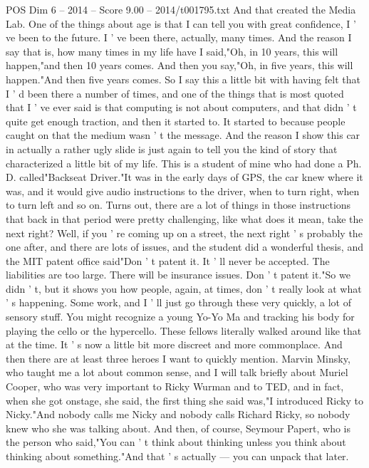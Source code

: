 \begin{textsample}{POS Dim 6 – 2014 – Score 9.00 – 2014/t001795.txt}
And that created the Media Lab.
One of the things about age is that I can tell you with great confidence, I ' ve been to the future.
I ' ve been there, actually, many times.
And the reason I say that is, how many times in my life have I said,"Oh, in 10 years, this will happen,"and then 10 years comes.
And then you say,"Oh, in five years, this will happen."And then five years comes.
So I say this a little bit with having felt that I ' d been there a number of times, and one of the things that is most quoted that I ' ve ever said is that computing is not about computers, and that didn ' t quite get enough traction, and then it started to.
It started to because people caught on that the medium wasn ' t the message.
And the reason I show this car in actually a rather ugly slide is just again to tell you the kind of story that characterized a little bit of my life.
This is a student of mine who had done a Ph.
D. called"Backseat Driver."It was in the early days of GPS, the car knew where it was, and it would give audio instructions to the driver, when to turn right, when to turn left and so on.
Turns out, there are a lot of things in those instructions that back in that period were pretty challenging, like what does it mean, take the next right?
Well, if you ' re coming up on a street, the next right ' s probably the one after, and there are lots of issues, and the student did a wonderful thesis, and the MIT patent office said"Don ' t patent it.
It ' ll never be accepted.
The liabilities are too large.
There will be insurance issues.
Don ' t patent it."So we didn ' t, but it shows you how people, again, at times, don ' t really look at what ' s happening.
Some work, and I ' ll just go through these very quickly, a lot of sensory stuff.
You might recognize a young Yo-Yo Ma and tracking his body for playing the cello or the hypercello.
These fellows literally walked around like that at the time.
It ' s now a little bit more discreet and more commonplace.
And then there are at least three heroes I want to quickly mention.
Marvin Minsky, who taught me a lot about common sense, and I will talk briefly about Muriel Cooper, who was very important to Ricky Wurman and to TED, and in fact, when she got onstage, she said, the first thing she said was,"I introduced Ricky to Nicky."And nobody calls me Nicky and nobody calls Richard Ricky, so nobody knew who she was talking about.
And then, of course, Seymour Papert, who is the person who said,"You can ' t think about thinking unless you think about thinking about something."And that ' s actually — you can unpack that later.

\end{textsample}
